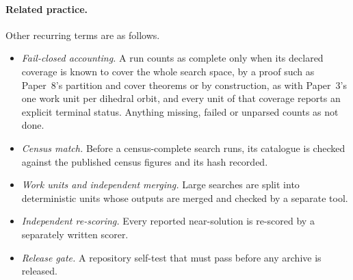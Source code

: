 \paragraph{Related practice.} Other recurring terms are as follows.
\begin{itemize}
\item \emph{Fail-closed accounting.} A run counts as complete only when its declared coverage is known to cover the whole search space, by a proof such as Paper~8's partition and cover theorems or by construction, as with Paper~3's one work unit per dihedral orbit, and every unit of that coverage reports an explicit terminal status. Anything missing, failed or unparsed counts as not done.
\item \emph{Census match.} Before a census-complete search runs, its catalogue is checked against
the published census figures and its hash recorded.
\item \emph{Work units and independent merging.} Large searches are split into deterministic units
whose outputs are merged and checked by a separate tool.
\item \emph{Independent re-scoring.} Every reported near-solution is re-scored by a separately
written scorer.
\item \emph{Release gate.} A repository self-test that must pass before any archive is released.
\end{itemize}



\tableofcontents
